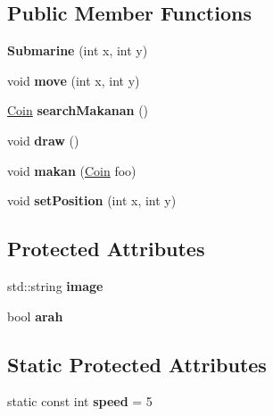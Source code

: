 \subsection*{Public Member Functions}
\begin{DoxyCompactItemize}
\item 
\mbox{\label{class_submarine_a082ce84d98c3bb77f4c6b37b7b722fff}} 
{\bfseries Submarine} (int x, int y)
\item 
\mbox{\label{class_submarine_aa1e9de02659e527c9317af6d0735ae38}} 
void {\bfseries move} (int x, int y)
\item 
\mbox{\label{class_submarine_a8dd0ef8e7a4807af41c618785c8862e0}} 
\mbox{\hyperlink{class_coin}{Coin}} {\bfseries search\+Makanan} ()
\item 
\mbox{\label{class_submarine_a8f6a81112391e7d082923a0426a2f5f9}} 
void {\bfseries draw} ()
\item 
\mbox{\label{class_submarine_aec0e6c8564323bdf9ed23da7ccf26beb}} 
void {\bfseries makan} (\mbox{\hyperlink{class_coin}{Coin}} foo)
\item 
\mbox{\label{class_submarine_a61ee6583f51781411784f43cfd20f2b2}} 
void {\bfseries set\+Position} (int x, int y)
\end{DoxyCompactItemize}
\subsection*{Protected Attributes}
\begin{DoxyCompactItemize}
\item 
\mbox{\label{class_submarine_a12e519e706f360e36f8b86e47fa9e754}} 
std\+::string {\bfseries image}
\item 
\mbox{\label{class_submarine_a7d48bdb23e694916d3c4ebf6891926b0}} 
bool {\bfseries arah}
\end{DoxyCompactItemize}
\subsection*{Static Protected Attributes}
\begin{DoxyCompactItemize}
\item 
\mbox{\label{class_submarine_a921dd740564221375149cc88d40fb010}} 
static const int {\bfseries speed} = 5
\end{DoxyCompactItemize}
